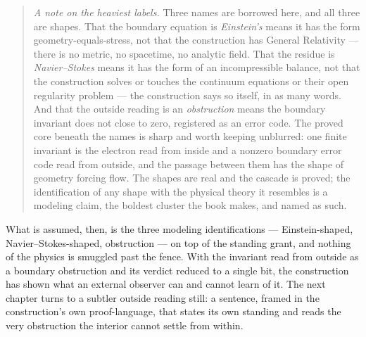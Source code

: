 \begin{quote}
\emph{A note on the heaviest labels.} Three names are borrowed here, and all three are shapes. That the
boundary equation is \emph{Einstein's} means it has the form geometry-equals-stress, not that the
construction has General Relativity --- there is no metric, no spacetime, no analytic field. That the
residue is \emph{Navier--Stokes} means it has the form of an incompressible balance, not that the
construction solves or touches the continuum equations or their open regularity problem --- the
construction says so itself, in as many words. And that the outside reading is an \emph{obstruction}
means the boundary invariant does not close to zero, registered as an error code. The proved core beneath
the names is sharp and worth keeping unblurred: one finite invariant is the electron read from inside and
a nonzero boundary error code read from outside, and the passage between them has the shape of geometry
forcing flow. The shapes are real and the cascade is proved; the identification of any shape with the
physical theory it resembles is a modeling claim, the boldest cluster the book makes, and named as such.
\end{quote}

What is assumed, then, is the three modeling identifications --- Einstein-shaped, Navier--Stokes-shaped,
obstruction --- on top of the standing grant, and nothing of the physics is smuggled past the fence. With
the invariant read from outside as a boundary obstruction and its verdict reduced to a single bit, the
construction has shown what an external observer can and cannot learn of it. The next chapter turns to a
subtler outside reading still: a sentence, framed in the construction's own proof-language, that states
its own standing and reads the very obstruction the interior cannot settle from within.
